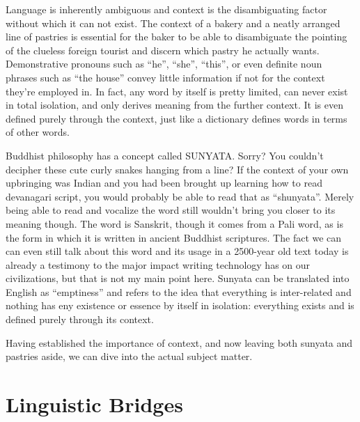 Language is inherently ambiguous and context is the disambiguating factor
without which it can not exist. The context of a bakery and a neatly arranged
line of pastries is essential for the baker to be able to disambiguate the
pointing of the clueless foreign tourist and discern which pastry he actually
wants. Demonstrative pronouns such as ``he'', ``she'', ``this'', or even
definite noun phrases such as ``the house'' convey little information if not
for the context they're employed in.  In fact, any word by itself is pretty
limited, can never exist in total isolation, and only derives meaning from the
further context. It is even defined purely through the context, just like a
dictionary defines words in terms of other words.

Buddhist philosophy has a concept called SUNYATA. Sorry? You couldn't decipher
these cute curly snakes hanging from a line? If the context of your own
upbringing was Indian and you had been brought up learning how to read
devanagari script, you would probably be able to read that as ``shunyata''.
Merely being able to read and vocalize the word still wouldn't bring you closer
to its meaning though. The word is Sanskrit, though it comes from a Pali word,
as is the form in which it is written in ancient Buddhist scriptures. The fact
we can can even still talk about this word and its usage in a 2500-year old
text today is already a testimony to the major impact writing technology has on
our civilizations, but that is not my main point here. Sunyata can be
translated into English as ``emptiness'' and refers to the idea that everything
is inter-related and nothing has eny existence or essence by itself in
isolation: everything exists and is defined purely through its context.

Having established the importance of context, and now leaving both sunyata and
pastries aside, we can dive into the actual subject matter.

\section{Linguistic Bridges}





